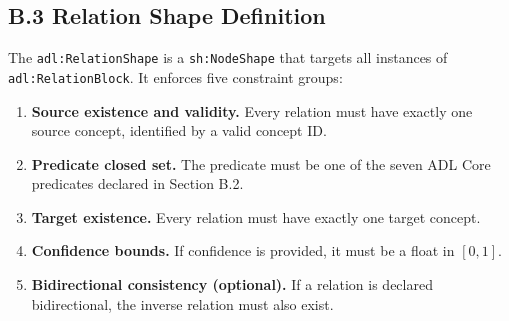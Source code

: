 \subsection{B.3 Relation Shape Definition}\label{b.3-relation-shape-definition}

The \texttt{adl:RelationShape} is a \texttt{sh:NodeShape} that targets all instances of \texttt{adl:RelationBlock}. It enforces five constraint groups:

\begin{enumerate}
\def\labelenumi{\arabic{enumi}.}
\tightlist
\item
  \textbf{Source existence and validity.} Every relation must have exactly one source concept, identified by a valid concept ID.
\item
  \textbf{Predicate closed set.} The predicate must be one of the seven ADL Core predicates declared in Section B.2.
\item
  \textbf{Target existence.} Every relation must have exactly one target concept.
\item
  \textbf{Confidence bounds.} If confidence is provided, it must be a float in \([0, 1]\).
\item
  \textbf{Bidirectional consistency (optional).} If a relation is declared bidirectional, the inverse relation must also exist.
\end{enumerate}

